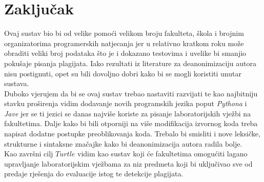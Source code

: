 \chapter*{Zaključak}

	Ovaj sustav bio bi od velike pomoći velikom broju fakulteta, škola i brojnim organizatorima programerskih natjecanja jer u relativno kratkom roku može obraditi veliki broj podataka što je i dokazano testovima i uvelike bi smanjio pokušaje pisanja plagijata. Iako rezultati iz literature za deanonimizaciju autora nisu postignuti, opet su bili dovoljno dobri kako bi se mogli koristiti unutar sustava. \\
	
	Duboko vjerujem da bi se ovaj sustav trebao nastaviti razvijati te kao najbitniju stavku proširenja vidim dodavanje novih programskih jezika poput \textit{Pythona} i \textit{Jave} jer se ti jezici se danas najviše koriste za pisanje laboratorijskih vježbi na fakultetima. Dalje kako bi bili otporniji na više modifikacija izvornog koda treba napisat dodatne postupke preoblikovanja koda. Trebalo bi smisliti i nove leksičke, strukturne i sintaksne značajke kako bi deanonimizacija autora radila bolje.  \\
	
	Kao završni cilj $Turtle$ vidim kao sustav koji će fakultetima omogućiti lagano upravljanje laboratorijskim vježbama za niz predmeta koji bi uključivao sve od predaje rješenja do evaluacije istog te detekcije plagijata. 
